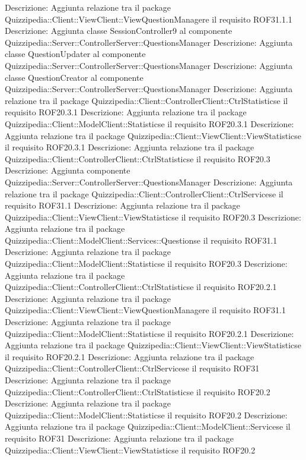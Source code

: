 Descrizione: Aggiunta relazione tra il package Quizzipedia::Client::ViewClient::ViewQuestionManagere il requisito ROF31.1.1 
Descrizione: Aggiunta classe SessionController9 al componente Quizzipedia::Server::ControllerServer::QuestionsManager 
Descrizione: Aggiunta classe QuestionUpdater al componente Quizzipedia::Server::ControllerServer::QuestionsManager 
Descrizione: Aggiunta classe QuestionCreator al componente Quizzipedia::Server::ControllerServer::QuestionsManager 
Descrizione: Aggiunta relazione tra il package Quizzipedia::Client::ControllerClient::CtrlStatisticse il requisito ROF20.3.1 
Descrizione: Aggiunta relazione tra il package Quizzipedia::Client::ModelClient::Statisticse il requisito ROF20.3.1 
Descrizione: Aggiunta relazione tra il package Quizzipedia::Client::ViewClient::ViewStatisticse il requisito ROF20.3.1 
Descrizione: Aggiunta relazione tra il package Quizzipedia::Client::ControllerClient::CtrlStatisticse il requisito ROF20.3 
Descrizione: Aggiunta componente Quizzipedia::Server::ControllerServer::QuestionsManager 
Descrizione: Aggiunta relazione tra il package Quizzipedia::Client::ControllerClient::CtrlServicese il requisito ROF31.1 
Descrizione: Aggiunta relazione tra il package Quizzipedia::Client::ViewClient::ViewStatisticse il requisito ROF20.3 
Descrizione: Aggiunta relazione tra il package Quizzipedia::Client::ModelClient::Services::Questionse il requisito ROF31.1 
Descrizione: Aggiunta relazione tra il package Quizzipedia::Client::ModelClient::Statisticse il requisito ROF20.3 
Descrizione: Aggiunta relazione tra il package Quizzipedia::Client::ControllerClient::CtrlStatisticse il requisito ROF20.2.1 
Descrizione: Aggiunta relazione tra il package Quizzipedia::Client::ViewClient::ViewQuestionManagere il requisito ROF31.1 
Descrizione: Aggiunta relazione tra il package Quizzipedia::Client::ModelClient::Statisticse il requisito ROF20.2.1 
Descrizione: Aggiunta relazione tra il package Quizzipedia::Client::ViewClient::ViewStatisticse il requisito ROF20.2.1 
Descrizione: Aggiunta relazione tra il package Quizzipedia::Client::ControllerClient::CtrlServicese il requisito ROF31 
Descrizione: Aggiunta relazione tra il package Quizzipedia::Client::ControllerClient::CtrlStatisticse il requisito ROF20.2 
Descrizione: Aggiunta relazione tra il package Quizzipedia::Client::ModelClient::Statisticse il requisito ROF20.2 
Descrizione: Aggiunta relazione tra il package Quizzipedia::Client::ModelClient::Servicese il requisito ROF31 
Descrizione: Aggiunta relazione tra il package Quizzipedia::Client::ViewClient::ViewStatisticse il requisito ROF20.2 
